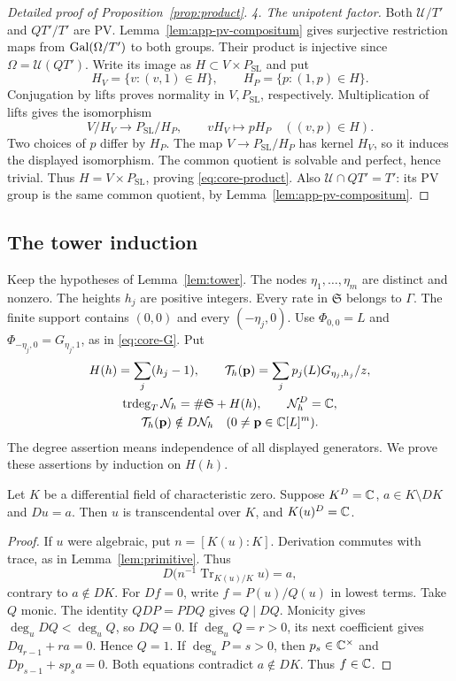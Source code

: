 \begin{proof}[Detailed proof of Proposition~\ref{prop:product}]
\emph{4. The unipotent factor.}
Both $\mathcal U/T'$ and $QT'/T'$ are PV.
Lemma~\ref{lem:app-pv-compositum} gives surjective restriction maps from
$\operatorname{Gal}(\Omega/T')$ to both groups.
Their product is injective since $\Omega=\mathcal U(QT')$.
Write its image as $H\subset V\times P_{\mathrm{SL}}$ and put
\[
 H_V=\{v:(v,1)\in H\},\qquad H_P=\{p:(1,p)\in H\}.
\]
Conjugation by lifts proves normality in $V,P_{\mathrm{SL}}$, respectively.
Multiplication of lifts gives the isomorphism
\[
 V/H_V\longrightarrow P_{\mathrm{SL}}/H_P,
 \qquad vH_V\longmapsto pH_P
 \quad((v,p)\in H).
\]
Two choices of $p$ differ by $H_P$. The map
$V\to P_{\mathrm{SL}}/H_P$ has kernel $H_V$, so it induces the displayed
isomorphism.
The common quotient is solvable and perfect, hence trivial.
Thus $H=V\times P_{\mathrm{SL}}$, proving \eqref{eq:core-product}.
Also $\mathcal U\cap QT'=T'$: its PV group is the same common quotient,
by Lemma~\ref{lem:app-pv-compositum}.
\end{proof}


\subsection{The tower induction}\label{app:tower-induction}
Keep the hypotheses of Lemma~\ref{lem:tower}.
The nodes $\eta_1,\ldots,\eta_m$ are distinct and nonzero.
The heights $h_j$ are positive integers.
Every rate in $\mathfrak S$ belongs to $\Gamma$.
The finite support contains $(0,0)$ and every $(-\eta_j,0)$.
Use $\Phi_{0,0}=L$ and $\Phi_{-\eta_j,0}=G_{\eta_j,1}$,
as in \eqref{eq:core-G}.
Put
\begin{equation}\label{eq:appendix-tower-assertions}
\begin{gathered}
 H(h)=\sum_j(h_j-1),\qquad
 \mathcal T_h(\mathbf p)=\sum_jp_j(L)G_{\eta_j,h_j}/z,\\
 \operatorname{trdeg}_T\mathcal N_h=\#\mathfrak S+H(h),\qquad
 \mathcal N_h^D=\mathbb{C},\\
 \mathcal T_h(\mathbf p)\notin D\mathcal N_h
 \quad(0\ne\mathbf p\in\mathbb{C}[L]^m).
\end{gathered}
\end{equation}
The degree assertion means independence of all displayed generators.
We prove these assertions by induction on $H(h)$.

\begin{lemma}\label{lem:appendix-primitive-extension}
Let $K$ be a differential field of characteristic zero.
Suppose $K^D=\mathbb{C}$, $a\in K\setminus DK$ and $Du=a$.
Then $u$ is transcendental over $K$, and $K(u)^D=\mathbb{C}$.
\end{lemma}
\begin{proof}
If $u$ were algebraic, put $n=[K(u):K]$.
Derivation commutes with trace, as in Lemma~\ref{lem:primitive}.
Thus
\[
 D\bigl(n^{-1}\operatorname{Tr}_{K(u)/K}u\bigr)=a,
\]
contrary to $a\notin DK$.
For $Df=0$, write $f=P(u)/Q(u)$ in lowest terms.
Take $Q$ monic.
The identity $QDP=PDQ$ gives $Q\mid DQ$.
Monicity gives $\deg_u DQ<\deg_u Q$, so $DQ=0$.
If $\deg_u Q=r>0$, its next coefficient gives
$Dq_{r-1}+ra=0$.
Hence $Q=1$.
If $\deg_u P=s>0$, then $p_s\in\mathbb{C}^\times$ and
$Dp_{s-1}+sp_sa=0$.
Both equations contradict $a\notin DK$.
Thus $f\in\mathbb{C}$.
\end{proof}

